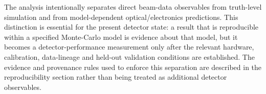 The analysis intentionally separates direct beam-data observables from truth-level simulation and from model-dependent optical/electronics predictions. This distinction is essential for the present detector state: a result that is reproducible within a specified Monte-Carlo model is evidence about that model, but it becomes a detector-performance measurement only after the relevant hardware, calibration, data-lineage and held-out validation conditions are established. The evidence and provenance rules used to enforce this separation are described in the reproducibility section rather than being treated as additional detector observables.

